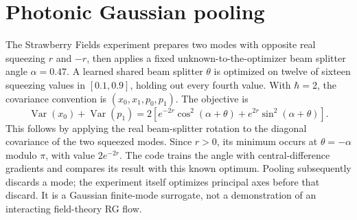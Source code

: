 \documentclass[11pt,oneside,openany]{book}
\theoremstyle{definition}\newtheorem{definition}[theorem]{Definition}
\theoremstyle{remark}\newtheorem{remark}[theorem]{Remark}
\begin{document}
\begin{center}
\end{center}

\section{Photonic Gaussian pooling}
The Strawberry Fields experiment prepares two modes with opposite real squeezing $r$ and $-r$, then applies a fixed unknown-to-the-optimizer beam splitter angle $\alpha=0.47$. A learned shared beam splitter $\theta$ is optimized on twelve of sixteen squeezing values in $[0.1,0.9]$, holding out every fourth value. With $\hbar=2$, the covariance convention is $(x_0,x_1,p_0,p_1)$. The objective is
\[
 \operatorname{Var}(x_0)+\operatorname{Var}(p_1)
 =2\left[e^{-2r}\cos^2(\alpha+\theta)+e^{2r}\sin^2(\alpha+\theta)\right].
\]
This follows by applying the real beam-splitter rotation to the diagonal covariance of the two squeezed modes. Since $r>0$, its minimum occurs at $\theta=-\alpha$ modulo $\pi$, with value $2e^{-2r}$. The code trains the angle with central-difference gradients and compares its result with this known optimum. Pooling subsequently discards a mode; the experiment itself optimizes principal axes before that discard. It is a Gaussian finite-mode surrogate, not a demonstration of an interacting field-theory RG flow.
\end{document}
